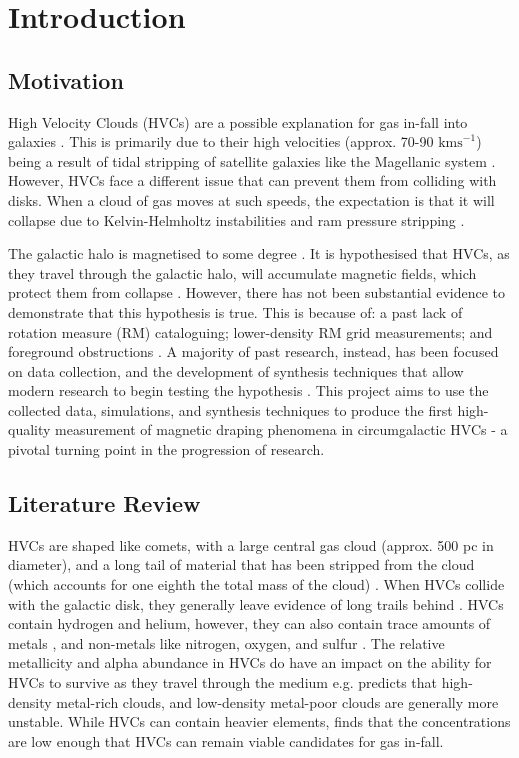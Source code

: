 \chapter{Introduction}
\label{cha:introduction}

\section{Motivation}
\label{sec:motivation}
High Velocity Clouds (HVCs) are a possible explanation for gas in-fall into galaxies \cite{ID7}. This is primarily due to their high velocities (approx. 70-90 $\mathrm{kms}^{-1}$) being a result of tidal stripping of satellite galaxies like the Magellanic system \cite{ID7, ID8}. However, HVCs face a different issue that can prevent them from colliding with disks. When a cloud of gas moves at such speeds, the expectation is that it will collapse due to Kelvin-Helmholtz instabilities and ram pressure stripping \cite{ID23, ID33, ID11}.

The galactic halo is magnetised to some degree \cite{ID30}. It is hypothesised that HVCs, as they travel through the galactic halo, will accumulate magnetic fields, which protect them from collapse \cite{ID10, ID11, ID13, ID23, ID24, ID34}. However, there has not been substantial evidence to demonstrate that this hypothesis is true. This is because of: a past lack of rotation measure (RM) cataloguing; lower-density RM grid measurements; and foreground obstructions \cite{ID2, ID18, ID36}. A majority of past research, instead, has been focused on data collection, and the development of synthesis techniques that allow modern research to begin testing the hypothesis \cite{ID18, ID1, ID3, ID6, ID5, ID30, ID26}. This project aims to use the collected data, simulations, and synthesis techniques to produce the first high-quality measurement of magnetic draping phenomena in circumgalactic HVCs - a pivotal turning point in the progression of research.

\section{Literature Review}
\label{sec:lit-review}

HVCs are shaped like comets, with a large central gas cloud (approx. 500 pc in diameter), and a long tail of material that has been stripped from the cloud (which accounts for one eighth the total mass of the cloud) \cite{ID34, ID13}. When HVCs collide with the galactic disk, they generally leave evidence of long trails behind \cite{ID19}. HVCs contain hydrogen and helium, however, they can also contain trace amounts of metals \cite{ID46}, and non-metals like nitrogen, oxygen, and sulfur \cite{ID48, ID49}. The relative metallicity and alpha abundance in HVCs do have an impact on the ability for HVCs to survive as they travel through the medium e.g. \citep{ID24} predicts that high-density metal-rich clouds, and low-density metal-poor clouds are generally more unstable. While HVCs can contain heavier elements, \citep{ID46} finds that the concentrations are low enough that HVCs can remain viable candidates for gas in-fall.

